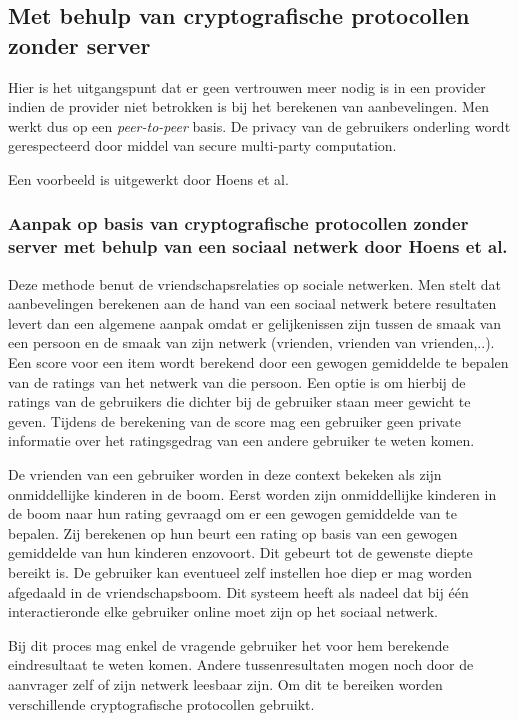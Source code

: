 \subsection{Met behulp van cryptografische protocollen zonder server}

Hier is het uitgangspunt dat er geen vertrouwen meer nodig is in een provider indien de provider niet betrokken is bij het berekenen van aanbevelingen. Men werkt dus op een \textit{peer-to-peer} basis. De privacy van de gebruikers onderling wordt gerespecteerd door middel van secure multi-party computation.

Een voorbeeld is uitgewerkt door Hoens et al. 


\subsubsection{Aanpak op basis van cryptografische protocollen zonder server met behulp van een sociaal netwerk door Hoens et al. \cite{hoens2010private}}


Deze methode benut de vriendschapsrelaties op sociale netwerken. Men stelt dat aanbevelingen berekenen aan de hand van een sociaal netwerk betere resultaten levert dan een algemene aanpak omdat er gelijkenissen zijn tussen de smaak van een persoon en de smaak van zijn netwerk (vrienden, vrienden van vrienden,..). Een score voor een item wordt berekend door een gewogen gemiddelde te bepalen van de ratings van het netwerk van die persoon. Een optie is om hierbij de ratings van de gebruikers die dichter bij de gebruiker staan meer gewicht te geven. 
Tijdens de berekening van de score mag een gebruiker geen private informatie over het ratingsgedrag van een andere gebruiker te weten komen.

De vrienden van een gebruiker worden in deze context bekeken als zijn onmiddellijke kinderen in de boom. Eerst worden zijn onmiddellijke kinderen in de boom naar hun rating gevraagd om er een gewogen gemiddelde van te bepalen. Zij berekenen op hun beurt een rating op basis van een gewogen gemiddelde van hun kinderen enzovoort. Dit gebeurt tot de gewenste diepte bereikt is. De gebruiker kan eventueel zelf instellen hoe diep er mag worden afgedaald in de vriendschapsboom. Dit systeem heeft als nadeel dat bij \'e\'en interactieronde elke gebruiker online moet zijn op het sociaal netwerk.

Bij dit proces mag enkel de vragende gebruiker het voor hem berekende eindresultaat te weten komen. Andere tussenresultaten mogen noch door de aanvrager zelf of zijn netwerk leesbaar zijn. Om dit te bereiken worden verschillende cryptografische protocollen gebruikt. 

